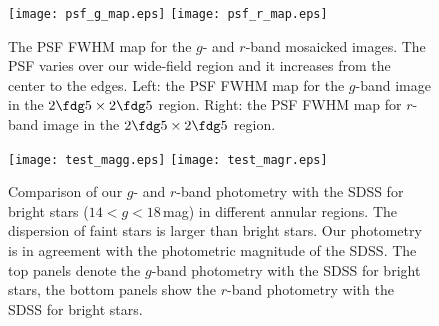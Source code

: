 \documentclass[twocolumn,trackchanges]{aastex61}
\begin{document}

\begin{figure}[htb!]
 \setcounter{figure}{0} \renewcommand{\thefigure}{A.\arabic{figure}} 
 \begin{center}
  \texttt{[image: psf\_g\_map.eps]}
  \texttt{[image: psf\_r\_map.eps]}
  
  \caption{The PSF FWHM map for the $g$- and $r$-band mosaicked images. The PSF varies over our wide-field region and it increases from the center to the edges. Left: the PSF FWHM map for the $g$-band image in the $2\fdg5 \times 2\fdg5$ region. Right: the PSF FWHM map for $r$-band image in the $2\fdg5 \times 2\fdg5$ region.\label{fig:figA1}}
  \label{fig:figA1}
 \end{center}
\end{figure}

\begin{figure}[htb]
 \setcounter{figure}{1} \renewcommand{\thefigure}{A.\arabic{figure}} 

 \begin{center}
  \setlength{\abovecaptionskip}{-5pt}
  \texttt{[image: test\_magg.eps]}
  \texttt{[image: test\_magr.eps]}
  \caption{Comparison of our $g$- and $r$-band photometry with the SDSS for bright stars ($14< g <18$\,mag) in different annular regions. The dispersion of faint stars is larger than bright stars. Our photometry is in agreement with the photometric magnitude of the SDSS. The top panels denote the $g$-band photometry with the SDSS for bright stars, the bottom panels show the $r$-band photometry with the SDSS for bright stars.}
  \label{fig:figA2}
 \end{center}
\end{figure}


\clearpage
\end{document}
